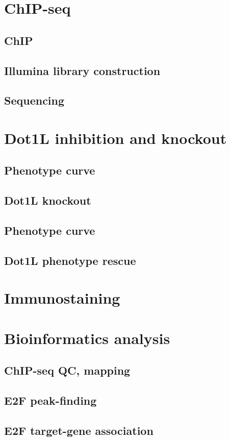 \documentclass[11pt,twoside,a4paper]{report}
\begin{document}
	\section{ChIP-seq}
		\subsection{ChIP}
		\subsection{Illumina library construction}
		\subsection{Sequencing}

	\section{Dot1L inhibition and knockout}
		\subsection{Phenotype curve}
		\subsection{Dot1L knockout}
		\subsection{Phenotype curve}
		\subsection{Dot1L phenotype rescue}

	\section{Immunostaining}
	\section{Bioinformatics analysis}
		\subsection{ChIP-seq QC, mapping}
		\subsection{E2F peak-finding}
		\subsection{E2F target-gene association}
\end{document}
